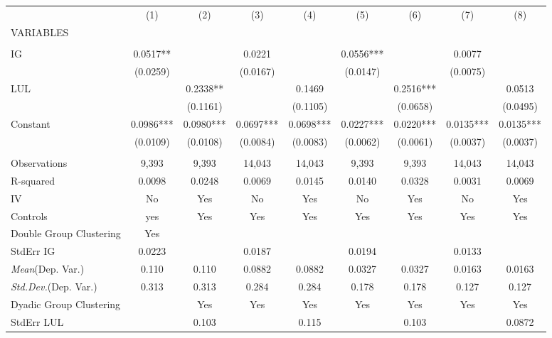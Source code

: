 \documentclass[]{article}
\begin{document}
\begin{tabular}{lcccccccc} \hline
 & (1) & (2) & (3) & (4) & (5) & (6) & (7) & (8) \\
VARIABLES &  &  &  &  &  &  &  &  \\ \hline
 &  &  &  &  &  &  &  &  \\
IG & 0.0517** &  & 0.0221 &  & 0.0556*** &  & 0.0077 &  \\
 & (0.0259) &  & (0.0167) &  & (0.0147) &  & (0.0075) &  \\
LUL &  & 0.2338** &  & 0.1469 &  & 0.2516*** &  & 0.0513 \\
 &  & (0.1161) &  & (0.1105) &  & (0.0658) &  & (0.0495) \\
Constant & 0.0986*** & 0.0980*** & 0.0697*** & 0.0698*** & 0.0227*** & 0.0220*** & 0.0135*** & 0.0135*** \\
 & (0.0109) & (0.0108) & (0.0084) & (0.0083) & (0.0062) & (0.0061) & (0.0037) & (0.0037) \\
 &  &  &  &  &  &  &  &  \\
Observations & 9,393 & 9,393 & 14,043 & 14,043 & 9,393 & 9,393 & 14,043 & 14,043 \\
R-squared & 0.0098 & 0.0248 & 0.0069 & 0.0145 & 0.0140 & 0.0328 & 0.0031 & 0.0069 \\
IV & No & Yes & No & Yes & No & Yes & No & Yes \\
Controls & yes & Yes & Yes & Yes & Yes & Yes & Yes & Yes \\
Double Group Clustering & Yes &  &  &  &  &  &  &  \\
StdErr IG & 0.0223 &  & 0.0187 &  & 0.0194 &  & 0.0133 &  \\
\textit{Mean}(Dep. Var.) & 0.110 & 0.110 & 0.0882 & 0.0882 & 0.0327 & 0.0327 & 0.0163 & 0.0163 \\
\textit{Std.Dev.}(Dep. Var.) & 0.313 & 0.313 & 0.284 & 0.284 & 0.178 & 0.178 & 0.127 & 0.127 \\
Dyadic Group Clustering &  & Yes & Yes & Yes & Yes & Yes & Yes & Yes \\
 StdErr LUL &  & 0.103 &  & 0.115 &  & 0.103 &  & 0.0872 \\ \hline
\end{tabular}
\end{document}
